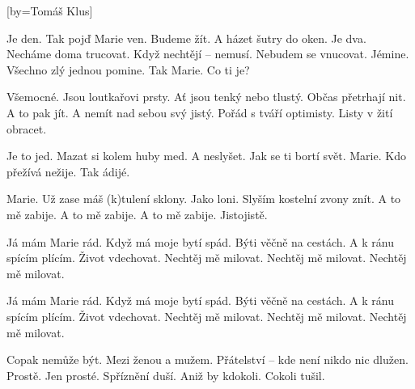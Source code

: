 [by={Tomáš Klus}]

\beginverse{}
Je den. Tak pojď Marie ven.
Budeme žít. A házet šutry do oken.
Je dva. Necháme doma trucovat.
Když nechtějí -- nemusí. Nebudem se vnucovat.
Jémine. Všechno zlý jednou pomine.
Tak Marie. Co ti je?
\endverse{}

\beginverse{}
\chordsoff{}
Všemocné. Jsou loutkařovi prsty.
Ať jsou tenký nebo tlustý. Občas přetrhají nit.
A to pak jít. A nemít nad sebou svý jistý.
Pořád s tváří optimisty. Listy v žití obracet.
\chordson{}
\endverse{}

\beginverse{}
\chordsoff{}
Je to jed. Mazat si kolem huby med.
A neslyšet. Jak se ti bortí svět.
Marie. Kdo přežívá nežije. Tak ádijé. 
\chordson{}
\endverse{}

\beginverse{}
\chordsoff{}
Marie. Už zase máš (k)tulení sklony.
Jako loni. Slyším kostelní zvony znít.
A to mě zabije. A to mě zabije.
A to mě zabije. Jistojistě.
\chordson{}
\endverse{}

\beginchorus{}
Já mám Marie rád. Když má moje bytí spád.
Býti věčně na cestách. A k ránu spícím plícím.
Život vdechovat. Nechtěj mě milovat.
Nechtěj mě milovat. Nechtěj mě milovat. 
\endchorus{}

\repeatingchorus{}
\beginchorus{}
\chordsoff{}
Já mám Marie rád. Když má moje bytí spád.
Býti věčně na cestách. A k ránu spícím plícím.
Život vdechovat. Nechtěj mě milovat.
Nechtěj mě milovat. Nechtěj mě milovat. 
\chordson{}
\endchorus{}

\beginverse{}
\chordsoff{}
Copak nemůže být. Mezi ženou a mužem.
Přátelství -- kde není nikdo nic dlužen. Prostě.
Jen prosté. Spříznění duší.
Aniž by kdokoli. Cokoli tušil.
\chordson{}
\endverse{}

